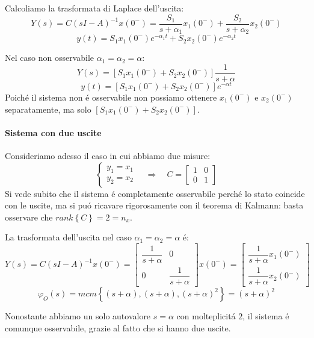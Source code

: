 \documentclass[../main.tex]{subfiles}
\begin{document}
\begin{mdframed}[style=Exercise]
\begin{Exercise}[title={Studiare l'osservabilit\'a di due vasche in parallelo}]
					Calcoliamo la trasformata di Laplace dell'uscita:
					\[
						Y(s) = C(sI-A)^{-1} x(0^{-}) = \dfrac{S_1}{s+\alpha_1}x_1(0^{-}) + \dfrac{S_2}{s+\alpha_2}x_2(0^{-})
					\]
					\[
						y(t) = S_1x_1(0^{-}) e^{-\alpha_1 t} + S_2x_2(0^{-}) e^{-\alpha_2 t}
					\]
					
					Nel caso non osservabile $ \alpha_1 = \alpha_2 = \alpha $:
					\[
						Y(s) = [S_1 x_1(0^{-}) + S_2 x_2(0^{-})] \dfrac{1}{s+\alpha}
					\]
					\[
						y(t) = [S_1 x_1(0^{-}) + S_2 x_2(0^{-})] e^{-\alpha t}
					\]
					Poich\'e il sistema non \'e osservabile non possiamo ottenere $ x_1(0^{-}) $ e $ x_2(0^{-}) $ separatamente, ma solo $ \left[ S_1 x_1(0^{-}) + S_2 x_2(0^{-}) \right] $.
				
				\paragraph{Sistema con due uscite}
					Consideriamo adesso il caso in cui abbiamo due misure:
					\[
						\begin{cases}
							y_1 = x_1\\
							y_2 = x_2
						\end{cases}
						\quad\Rightarrow\quad
						C =
						\begin{bmatrix}
							1 & 0\\
							0 & 1
						\end{bmatrix}
					\]
					Si vede subito che il sistema \'e completamente osservabile perch\'e lo stato coincide con le uscite, ma si pu\'o ricavare rigorosamente con il teorema di Kalmann: basta osservare che $ rank\left\lbrace C \right\rbrace = 2 = n_x $.
					
					La trasformata dell'uscita nel caso $ \alpha_1 = \alpha_2 = \alpha $ \'e:
					\[
						Y(s) = C(sI-A)^{-1} x(0^{-}) =
						\begin{bmatrix}
							\dfrac{1}{s+\alpha} & 0\\
							0 & \dfrac{1}{s+\alpha}
						\end{bmatrix} x(0^{-}) =
						\begin{bmatrix}
							\dfrac{1}{s+\alpha} x_1(0^{-})
							\\[1em]
							\dfrac{1}{s+\alpha} x_2(0^{-})
						\end{bmatrix}
					\]
					\[
						\varphi_O(s) = mcm\left\lbrace (s+\alpha), (s+\alpha), (s+\alpha)^2 \right\rbrace = (s+\alpha)^2
					\]
					
					Nonostante abbiamo un solo autovalore $ s = \alpha $ con molteplicit\'a $ 2 $, il sistema \'e comunque osservabile, grazie al fatto che si hanno due uscite.
			\end{Exercise}
		\end{mdframed}
\end{document}
